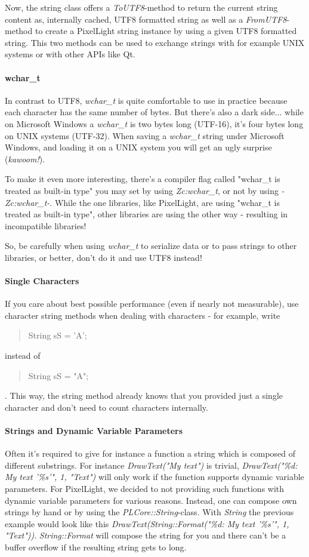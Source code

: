 Now, the string class offers a \emph{ToUTF8}-method to return the current string content as, internally cached, UTF8 formatted string as well as a \emph{FromUTF8}-method to create a PixelLight string instance by using a given UTF8 formatted string. This two methods can be used to exchange strings with for example UNIX systems or with other APIs like Qt.


\paragraph{wchar\_t}
In contrast to UTF8, \emph{wchar\_t} is quite comfortable to use in practice because each character has the same number of bytes. But there's also a dark side... while on Microsoft Windows a \emph{wchar\_t} is two bytes long (UTF-16), it's four bytes long on UNIX systems (UTF-32). When saving a \emph{wchar\_t} string under Microsoft Windows, and loading it on a UNIX system you will get an ugly surprise (\emph{kawoom!}).

To make it even more interesting, there's a compiler flag called "wchar\_t is treated as built-in type" you may set by using \emph{Zc:wchar\_t}, or not by using \emph{-Zc:wchar\_t-}. While the one libraries, like PixelLight, are using "wchar\_t is treated as built-in type", other libraries are using the other way - resulting in incompatible libraries!

So, be carefully when using \emph{wchar\_t} to serialize data or to pass strings to other libraries, or better, don't do it and use UTF8 instead!


\paragraph{Single Characters}
If you care about best possible performance (even if nearly not measurable), use character string methods when dealing with characters - for example, write \begin{quote}String sS = 'A';\end{quote} instead of \begin{quote}String sS = "A";\end{quote}. This way, the string method already knows that you provided just a single character and don't need to count characters internally.


\paragraph{Strings and Dynamic Variable Parameters}
Often it's required to give for instance a function a string which is composed of different substrings. For instance \emph{DrawText("My text")} is trivial, \emph{DrawText("\%d: My text '\%s'", 1, "Text")} will only work if the function supports dynamic variable parameters. For PixelLight, we decided to not providing such functions with dynamic variable parameters for various reasons. Instead, one can compose own strings by hand or by using the \emph{PLCore::String}-class. With \emph{String} the previous example would look like this \emph{DrawText(String::Format("\%d: My text '\%s'", 1, "Text"))}. \emph{String::Format} will compose the string for you and there can't be a buffer overflow if the resulting string gets to long.

